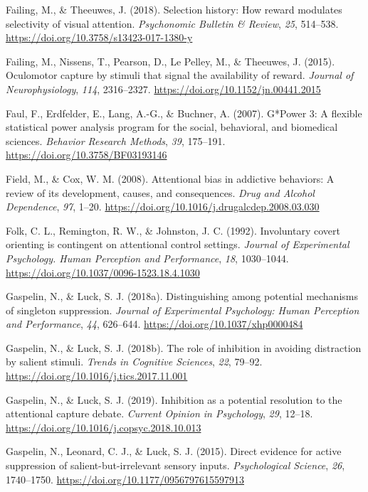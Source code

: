 \documentclass[man, a4paper, noextraspace, 11pt,floatsintext]{apa6}
\begin{document}
\hypertarget{ref-Failing2018}{}
Failing, M., \& Theeuwes, J. (2018). Selection history: How reward
modulates selectivity of visual attention. \emph{Psychonomic Bulletin \&
Review}, \emph{25}, 514--538.
\url{https://doi.org/10.3758/s13423-017-1380-y}

\hypertarget{ref-Failing2015}{}
Failing, M., Nissens, T., Pearson, D., Le Pelley, M., \& Theeuwes, J.
(2015). Oculomotor capture by stimuli that signal the availability of
reward. \emph{Journal of Neurophysiology}, \emph{114}, 2316--2327.
\url{https://doi.org/10.1152/jn.00441.2015}

\hypertarget{ref-Faul2007}{}
Faul, F., Erdfelder, E., Lang, A.-G., \& Buchner, A. (2007). G*Power 3:
A flexible statistical power analysis program for the social,
behavioral, and biomedical sciences. \emph{Behavior Research Methods},
\emph{39}, 175--191. \url{https://doi.org/10.3758/BF03193146}

\hypertarget{ref-Field2008}{}
Field, M., \& Cox, W. M. (2008). Attentional bias in addictive
behaviors: A review of its development, causes, and consequences.
\emph{Drug and Alcohol Dependence}, \emph{97}, 1--20.
\url{https://doi.org/10.1016/j.drugalcdep.2008.03.030}

\hypertarget{ref-Folk1992}{}
Folk, C. L., Remington, R. W., \& Johnston, J. C. (1992). Involuntary
covert orienting is contingent on attentional control settings.
\emph{Journal of Experimental Psychology. Human Perception and
Performance}, \emph{18}, 1030--1044.
\url{https://doi.org/10.1037/0096-1523.18.4.1030}

\hypertarget{ref-Gaspelin2018b}{}
Gaspelin, N., \& Luck, S. J. (2018a). Distinguishing among potential
mechanisms of singleton suppression. \emph{Journal of Experimental
Psychology: Human Perception and Performance}, \emph{44}, 626--644.
\url{https://doi.org/10.1037/xhp0000484}

\hypertarget{ref-Gaspelin2018}{}
Gaspelin, N., \& Luck, S. J. (2018b). The role of inhibition in avoiding
distraction by salient stimuli. \emph{Trends in Cognitive Sciences},
\emph{22}, 79--92. \url{https://doi.org/10.1016/j.tics.2017.11.001}

\hypertarget{ref-Gaspelin2018a}{}
Gaspelin, N., \& Luck, S. J. (2019). Inhibition as a potential
resolution to the attentional capture debate. \emph{Current Opinion in
Psychology}, \emph{29}, 12--18.
\url{https://doi.org/10.1016/j.copsyc.2018.10.013}

\hypertarget{ref-Gaspelin2015}{}
Gaspelin, N., Leonard, C. J., \& Luck, S. J. (2015). Direct evidence for
active suppression of salient-but-irrelevant sensory inputs.
\emph{Psychological Science}, \emph{26}, 1740--1750.
\url{https://doi.org/10.1177/0956797615597913}
\end{document}
